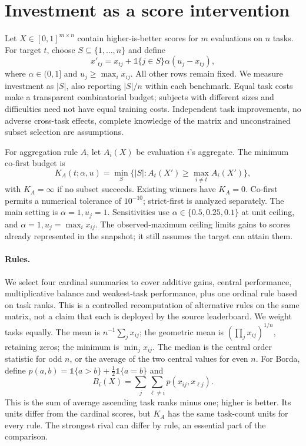 \section{Investment as a score intervention}
\label{sec:methods}
Let $X\in[0,1]^{m\times n}$ contain higher-is-better scores for $m$ evaluations on $n$ tasks. For target $t$, choose $S\subseteq\{1,\ldots,n\}$ and define
\begin{equation}
 x'_{tj}=x_{tj}+\mathbb{1}\{j\in S\}\alpha(u_j-x_{tj}),
 \label{eq:intervention}
\end{equation}
where $\alpha\in(0,1]$ and $u_j\geq\max_i x_{ij}$. All other rows remain fixed. We measure investment as $|S|$, also reporting $|S|/n$ within each benchmark. Equal task costs make a transparent combinatorial budget; subjects with different sizes and difficulties need not have equal training costs. Independent task improvements, no adverse cross-task effects, complete knowledge of the matrix and unconstrained subset selection are assumptions.

For aggregation rule $A$, let $A_i(X)$ be evaluation $i$'s aggregate. The minimum co-first budget is
\begin{equation}
 K_A(t;\alpha,u)=\min_S\{|S|: A_t(X')\geq\max_{i\ne t}A_i(X')\},
 \label{eq:budget}
\end{equation}
with $K_A=\infty$ if no subset succeeds. Existing winners have $K_A=0$. Co-first permits a numerical tolerance of $10^{-10}$; strict-first is analyzed separately. The main setting is $\alpha=1,u_j=1$. Sensitivities use $\alpha\in\{0.5,0.25,0.1\}$ at unit ceiling, and $\alpha=1,u_j=\max_i x_{ij}$. The observed-maximum ceiling limits gains to scores already represented in the snapshot; it still assumes the target can attain them.

\paragraph{Rules.}
We select four cardinal summaries to cover additive gains, central performance, multiplicative balance and weakest-task performance, plus one ordinal rule based on task ranks. This is a controlled recomputation of alternative rules on the same matrix, not a claim that each is deployed by the source leaderboard. We weight tasks equally. The mean is $n^{-1}\sum_j x_{ij}$; the geometric mean is $(\prod_j x_{ij})^{1/n}$, retaining zeros; the minimum is $\min_j x_{ij}$. The median is the central order statistic for odd $n$, or the average of the two central values for even $n$. For Borda, define $p(a,b)=\mathbb{1}\{a>b\}+\tfrac12\mathbb{1}\{a=b\}$ and
\begin{equation}
 B_i(X)=\sum_j\sum_{\ell\ne i}p(x_{ij},x_{\ell j}).
\end{equation}
This is the sum of average ascending task ranks minus one; higher is better. Its units differ from the cardinal scores, but $K_A$ has the same task-count units for every rule. The strongest rival can differ by rule, an essential part of the comparison.

